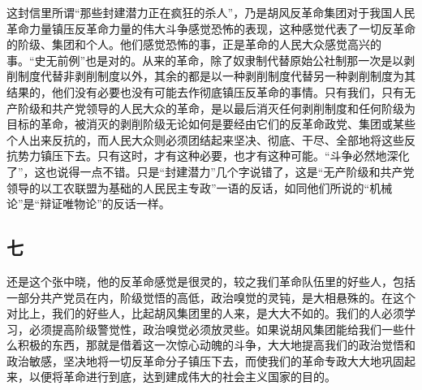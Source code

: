 这封信里所谓“那些封建潜力正在疯狂的杀人”，乃是胡风反革命集团对于我国人民革命力量镇压反革命力量的伟大斗争感觉恐怖的表现，这种感觉代表了一切反革命的阶级、集团和个人。他们感觉恐怖的事，正是革命的人民大众感觉高兴的事。“史无前例”也是对的。从来的革命，除了奴隶制代替原始公社制那一次是以剥削制度代替非剥削制度以外，其余的都是以一种剥削制度代替另一种剥削制度为其结果的，他们没有必要也没有可能去作彻底镇压反革命的事情。只有我们，只有无产阶级和共产党领导的人民大众的革命，是以最后消灭任何剥削制度和任何阶级为目标的革命，被消灭的剥削阶级无论如何是要经由它们的反革命政党、集团或某些个人出来反抗的，而人民大众则必须团结起来坚决、彻底、干尽、全部地将这些反抗势力镇压下去。只有这时，才有这种必要，也才有这种可能。“斗争必然地深化了”，这也说得一点不错。只是“封建潜力”几个字说错了，这是“无产阶级和共产党领导的以工农联盟为基础的人民民主专政”一语的反话，如同他们所说的“机械论”是“辩证唯物论”的反话一样。

\subsection*{七}

还是这个张中晓，他的反革命感觉是很灵的，较之我们革命队伍里的好些人，包括一部分共产党员在内，阶级觉悟的高低，政治嗅觉的灵钝，是大相悬殊的。在这个对比上，我们的好些人，比起胡风集团里的人来，是大大不如的。我们的人必须学习，必须提高阶级警觉性，政治嗅觉必须放灵些。如果说胡风集团能给我们一些什么积极的东西，那就是借着这一次惊心动魄的斗争，大大地提高我们的政治觉悟和政治敏感，坚决地将一切反革命分子镇压下去，而使我们的革命专政大大地巩固起来，以便将革命进行到底，达到建成伟大的社会主义国家的目的。
